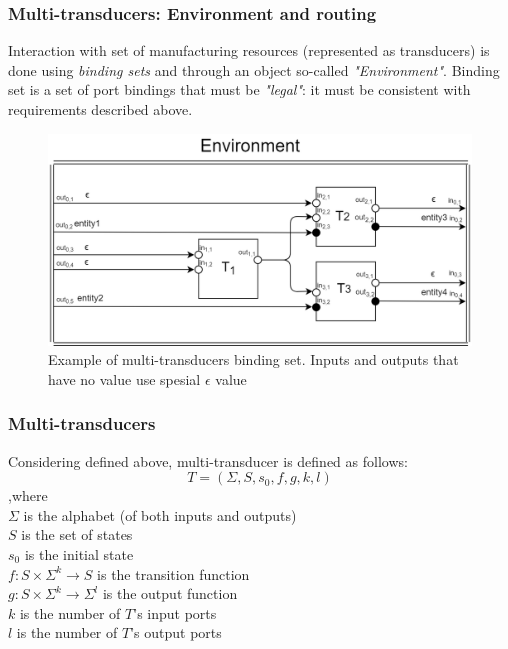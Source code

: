 \documentclass{beamer}
\theoremstyle{definition}
\theoremstyle{plain}
\begin{document}
\begin{frame}
\frametitle{Multi-transducers: Environment and routing}
Interaction with set of manufacturing resources (represented as transducers) is done using \textit{binding sets} and through an object so-called \textit{"Environment"}. Binding set is a set of port bindings that must be \textit{"legal"}: it must be consistent with requirements described above.

\begin{figure}
\includegraphics[scale=0.19]{images/mult_trans.png}
\caption{Example of multi-transducers binding set. Inputs and outputs that have no value use spesial $\epsilon$ value}
\end{figure}
\end{frame}

\begin{frame}
\frametitle{Multi-transducers}
Considering defined above, multi-transducer is defined as follows:
$$ T = (\Sigma, S, s_{0}, f, g, k, l) $$
,where\\
$\Sigma$ is the alphabet (of both inputs and outputs)\\
$S$ is the set of states\\
$s_{0}$ is the initial state\\
$f : S \times \Sigma^{k} \to S$ is the transition function\\
$ g : S \times \Sigma^{k} \to \Sigma^{l}$ is the output function\\
$k$ is the number of $T$'s input ports\\
$l$ is the number of $T$'s output ports
\end{frame}
\end{document}

